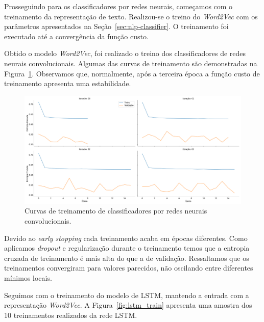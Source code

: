 Prosseguindo para os classificadores por redes neurais, começamos com o
treinamento da representação de texto.
Realizou-se o treino do \textit{Word2Vec} com os parâmetros
apresentados na Seção~\ref{sec:nlp-classifier}.
O treinamento foi executado até a convergência da função custo.

Obtido o modelo \textit{Word2Vec}, foi realizado o treino dos classificadores de
redes neurais convolucionais.
Algumas das curvas de treinamento são demonstradas na Figura~\ref{fig:cnn_train}.
Observamos que, normalmente, após a terceira época a função custo de treinamento
apresenta uma estabilidade.

\begin{figure}[h!]
\begin{center} {
    \begin{center}
    \includegraphics[scale=0.25]{images/cnn_train.png}
    \caption{Curvas de treinamento de classificadores por redes neurais
        convolucionais.}
    \label{fig:cnn_train}
    \end{center}
}
\end{center}
\end{figure}

Devido ao \textit{early stopping} cada treinamento acaba em épocas diferentes.
Como aplicamos \textit{dropout} e regularização durante o treinamento temos que
a entropia cruzada de treinamento é mais alta do que a de validação.
Ressaltamos que os treinamentos convergiram para valores parecidos, não
oscilando entre diferentes mínimos locais.

Seguimos com o treinamento do modelo de LSTM, mantendo a entrada com a
representação \textit{Word2Vec}.
A Figura~\ref{fig:lstm_train} apresenta uma amostra dos 10 treinamentos
realizados da rede LSTM.

